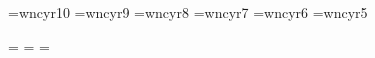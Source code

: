 \newcommand{\ol}{\overline}

\newfam\cyrfam
\font\tencyr=wncyr10    \font\ninecyr=wncyr9
\font\eightcyr=wncyr8   \font\sevencyr=wncyr7
\font\sixcyr=wncyr6     \font\fivecyr=wncyr5

\textfont\cyrfam=\tencyr
\scriptfont\cyrfam=\sevencyr
\scriptscriptfont\cyrfam=\fivecyr
\def\cyr{\fam\cyrfam\tencyr}

\newcommand{\co}{\langle}
\newcommand{\cf}{\rangle}
\newcommand{\Nat}{{\mathbb{N}}}
\newcommand{\shu}{\amalg\hspace{-1.3mm}\amalg}
\newcommand{\open}{\mbox{$[\![$}}
\newcommand{\close}{\mbox{$]\!]$}}
\newcommand{\mg}{\mathcal{G}}
\newcommand{\m}[1]{\mathcal{#1}}
\newcommand{\s}[1]{\stackrel{#1}{\ra}}
\newcommand{\mopen}{\mbox{$\{\!\!\{$}}
\newcommand{\mclose}{\mbox{$\}\!\!\}$}}
\newtheorem{nota}{Notation}[section]
\newenvironment{proofsketch}{\noindent {\bf Proof (Sketch):\,}}{\hfill$\;\;\Box$ \\[1ex]}


\def \vec#1{\overrightarrow{#1}}

